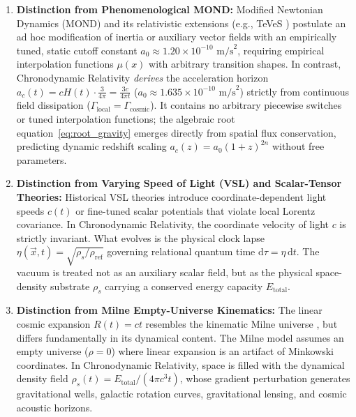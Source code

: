 \documentclass[aps,prd,reprint,superscriptaddress,nofootinbib,floatfix,amsmath,amssymb]{revtex4-2}
\begin{document}
\begin{enumerate}
    \item \textbf{Distinction from Phenomenological MOND:} Modified Newtonian Dynamics (MOND) \cite{Milgrom1983} and its relativistic extensions (e.g., TeVeS \cite{Bekenstein2004}) postulate an ad hoc modification of inertia or auxiliary vector fields with an empirically tuned, static cutoff constant $a_0 \approx 1.20 \times 10^{-10}\text{ m/s}^2$, requiring empirical interpolation functions $\mu(x)$ with arbitrary transition shapes. In contrast, Chronodynamic Relativity \textit{derives} the acceleration horizon $a_c(t) = c H(t) \cdot \frac{3}{4\pi} = \frac{3 c}{4\pi t}$ ($a_0 \approx 1.635 \times 10^{-10}\text{ m/s}^2$) strictly from continuous field dissipation ($\Gamma_{\text{local}} = \Gamma_{\text{cosmic}}$). It contains no arbitrary piecewise switches or tuned interpolation functions; the algebraic root equation~\eqref{eq:root_gravity} emerges directly from spatial flux conservation, predicting dynamic redshift scaling $a_c(z) = a_0 (1+z)^{2n}$ without free parameters.
    
    \item \textbf{Distinction from Varying Speed of Light (VSL) and Scalar-Tensor Theories:} Historical VSL theories \cite{AlbrechtMagueijo1999} introduce coordinate-dependent light speeds $c(t)$ or fine-tuned scalar potentials that violate local Lorentz covariance. In Chronodynamic Relativity, the coordinate velocity of light $c$ is strictly invariant. What evolves is the physical clock lapse $\eta(\vec{x}, t) = \sqrt{\rho_s/\rho_{\text{ref}}}$ governing relational quantum time $\mathrm{d}\tau = \eta\,\mathrm{d}t$. The vacuum is treated not as an auxiliary scalar field, but as the physical space-density substrate $\rho_s$ carrying a conserved energy capacity $E_{\text{total}}$.
    
    \item \textbf{Distinction from Milne Empty-Universe Kinematics:} The linear cosmic expansion $R(t) = ct$ resembles the kinematic Milne universe \cite{Milne1935}, but differs fundamentally in its dynamical content. The Milne model assumes an empty universe ($\rho = 0$) where linear expansion is an artifact of Minkowski coordinates. In Chronodynamic Relativity, space is filled with the dynamical density field $\rho_s(t) = E_{\text{total}} / (4\pi c^3 t)$, whose gradient perturbation generates gravitational wells, galactic rotation curves, gravitational lensing, and cosmic acoustic horizons.
\end{enumerate}
\end{document}

